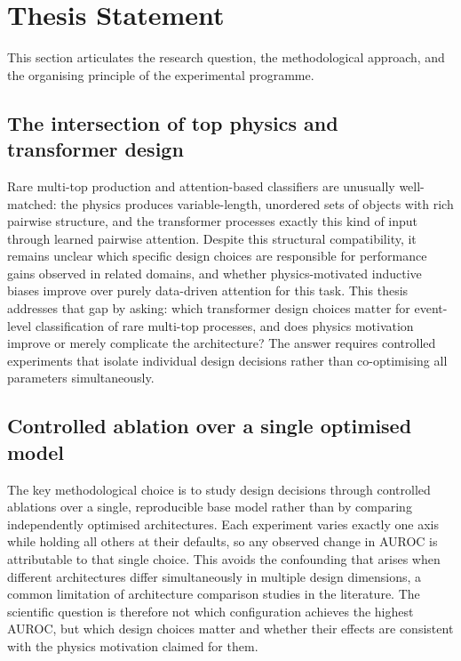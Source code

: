 \section{Thesis Statement}
\label{sec:intro_thesis_statement}

This section articulates the research question, the methodological approach, and the organising principle of the experimental programme.

\subsection{The intersection of top physics and transformer design}
\label{subsec:intro_intersection}

Rare multi-top production and attention-based classifiers are unusually well-matched: the physics produces variable-length, unordered sets of objects with rich pairwise structure, and the transformer processes exactly this kind of input through learned pairwise attention.
Despite this structural compatibility, it remains unclear which specific design choices are responsible for performance gains observed in related domains, and whether physics-motivated inductive biases improve over purely data-driven attention for this task.
This thesis addresses that gap by asking: which transformer design choices matter for event-level classification of rare multi-top processes, and does physics motivation improve or merely complicate the architecture?
The answer requires controlled experiments that isolate individual design decisions rather than co-optimising all parameters simultaneously.

\subsection{Controlled ablation over a single optimised model}
\label{subsec:intro_controlled_ablation}

The key methodological choice is to study design decisions through controlled ablations over a single, reproducible base model rather than by comparing independently optimised architectures.
Each experiment varies exactly one axis while holding all others at their defaults, so any observed change in AUROC is attributable to that single choice.
This avoids the confounding that arises when different architectures differ simultaneously in multiple design dimensions, a common limitation of architecture comparison studies in the literature.
The scientific question is therefore not which configuration achieves the highest AUROC, but which design choices matter and whether their effects are consistent with the physics motivation claimed for them.

